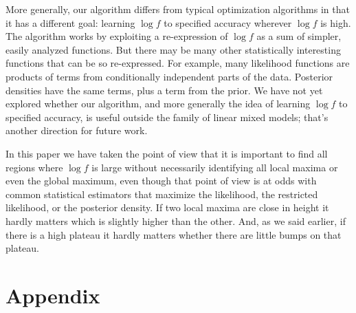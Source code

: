 \documentclass{report}
\newcommand{\RL}{f}
\newcommand{\logRL}{\log\RL}
\begin{document}
More generally, our algorithm differs from typical optimization algorithms in that it has a different goal: learning $\logRL$ to specified accuracy wherever $\logRL$ is high.  The algorithm works by exploiting a re-expression of $\logRL$ as a sum of simpler, easily analyzed functions.  But there may be many other statistically interesting functions that can be so re-expressed.  For example, many likelihood functions are products of terms from conditionally independent parts of the data.  Posterior densities have the same terms, plus a term from the prior.  We have not yet explored whether our algorithm, and more generally the idea of learning $\logRL$ to specified accuracy, is useful outside the family of linear mixed models; that's another direction for future work.

In this paper we have taken the point of view that it is important to find all regions where $\log f$ is large without necessarily identifying all local maxima or even the global maximum, even though that point of view is at odds with common statistical estimators that maximize the likelihood, the restricted likelihood, or the posterior density.  If two local maxima are close in height it hardly matters which is slightly higher than the other.  And, as we said earlier, if there is a high plateau it hardly matters whether there are little bumps on that plateau.

\section{Appendix}
\end{document}
